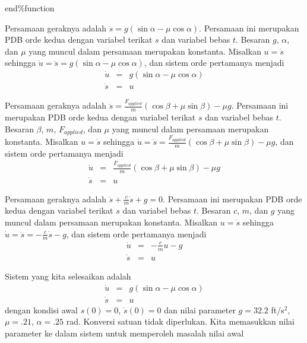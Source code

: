 \begin{description}
\begin{lyxcode}
end\%function~
\end{lyxcode}
\item [{\ref{exc:ode-taylor-13}c:}] Persamaan geraknya adalah $\ddot{s}=g(\sin\alpha-\mu\cos\alpha)$.
Persamaan ini merupakan PDB orde kedua dengan variabel terikat $s$
dan variabel bebas $t$. Besaran $g$, $\alpha$, dan $\mu$ yang
muncul dalam persamaan merupakan konstanta. Misalkan $u=\dot{s}$
sehingga $\dot{u}=\ddot{s}=g(\sin\alpha-\mu\cos\alpha)$, dan sistem
orde pertamanya menjadi
\begin{eqnarray*}
\dot{u} & = & g(\sin\alpha-\mu\cos\alpha)\\
\dot{s} & = & u
\end{eqnarray*}
\item [{\ref{exc:ode-taylor-13}f:}] Persamaan geraknya adalah $\ddot{s}=\frac{F_{applied}}{m}(\cos\beta+\mu\sin\beta)-\mu g$.
Persamaan ini merupakan PDB orde kedua dengan variabel terikat $s$
dan variabel bebas $t$. Besaran $\beta$, $m$, $F_{applied}$, dan
$\mu$ yang muncul dalam persamaan merupakan konstanta. Misalkan $u=\dot{s}$
sehingga $\dot{u}=\ddot{s}=\frac{F_{applied}}{m}(\cos\beta+\mu\sin\beta)-\mu g$,
dan sistem orde pertamanya menjadi
\begin{eqnarray*}
\dot{u} & = & \frac{F_{applied}}{m}(\cos\beta+\mu\sin\beta)-\mu g\\
\dot{s} & = & u
\end{eqnarray*}
\item [{\ref{exc:ode-taylor-13}m:}] Persamaan geraknya adalah $\ddot{s}+\frac{c}{m}\dot{s}+g=0$.
Persamaan ini merupakan PDB orde kedua dengan variabel terikat $s$
dan variabel bebas $t$. Besaran $c$, $m$, dan $g$ yang muncul
dalam persamaan merupakan konstanta. Misalkan $u=\dot{s}$ sehingga
$\dot{u}=\ddot{s}=-\frac{c}{m}\dot{s}-g$, dan sistem orde pertamanya
menjadi
\begin{eqnarray*}
\dot{u} & = & -\frac{c}{m}u-g\\
\dot{s} & = & u
\end{eqnarray*}
\item [{\ref{exc:ode-taylor-21}c:}] Sistem yang kita selesaikan adalah
\begin{eqnarray*}
\dot{u} & = & g(\sin\alpha-\mu\cos\alpha)\\
\dot{s} & = & u
\end{eqnarray*}
dengan kondisi awal $s(0)=0$, $\dot{s}(0)=0$ dan nilai parameter
$g=32.2$ ft/s$^{2}$, $\mu=.21$, $\alpha=.25$ rad. Konversi satuan
tidak diperlukan. Kita memasukkan nilai parameter ke dalam sistem
untuk memperoleh masalah nilai awal

\end{description}
